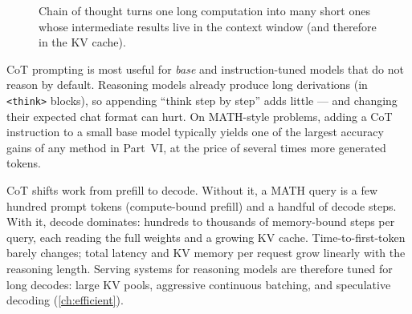 \begin{figure}[t]
\centering
{}
\caption{Chain of thought turns one long computation into many short ones whose intermediate
results live in the context window (and therefore in the KV cache).}
\label{fig:scaling:cot}
\end{figure}

\begin{keyidea}
CoT prompting is most useful for \emph{base} and instruction-tuned models that do not reason by
default. Reasoning models already produce long derivations (in \texttt{<think>} blocks), so
appending ``think step by step'' adds little --- and changing their expected chat format can hurt.
On MATH-style problems, adding a CoT instruction to a small base model typically yields one of the
largest accuracy gains of any method in Part~VI, at the price of several times more generated
tokens.
\end{keyidea}

\begin{systemslens}
CoT shifts work from prefill to decode. Without it, a MATH query is a few hundred prompt tokens
(compute-bound prefill) and a handful of decode steps. With it, decode dominates: hundreds to
thousands of memory-bound steps per query, each reading the full weights and a growing KV cache.
Time-to-first-token barely changes; total latency and KV memory per request grow linearly with
the reasoning length. Serving systems for reasoning models are therefore tuned for long decodes:
large KV pools, aggressive continuous batching, and speculative decoding (\cref{ch:efficient}).
\end{systemslens}

